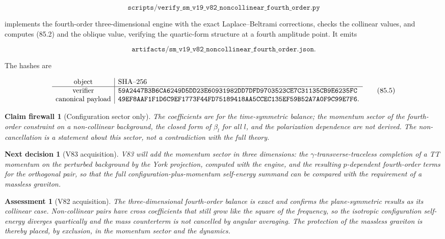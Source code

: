 \documentclass[11pt]{article}
\newtheorem{firewall}[theorem]{Claim firewall}
\newtheorem{decision}[theorem]{Next decision}
\newtheorem{assessment}[theorem]{Assessment}
\theoremstyle{remark}
\begin{document}
\[
 \texttt{scripts/verify\_sm\_v19\_v82\_noncollinear\_fourth\_order.py}
                                                                    \tag{85.3}
\]

implements the fourth-order three-dimensional engine with the exact
Laplace--Beltrami corrections, checks the collinear values, and
computes (85.2) and the oblique value, verifying the quartic-form
structure at a fourth amplitude point.  It emits

\[
 \texttt{artifacts/sm\_v19\_v82\_noncollinear\_fourth\_order.json}.  \tag{85.4}
\]

The hashes are

\[
\begin{array}{c|l}
\hbox{object}&\hbox{SHA--256}\\ \hline
\hbox{verifier}&
\texttt{59A2447B3B6CA6249D5DD23E60931982DD7DFD9703523CE7C31135CB9E6235FC}\\
\hbox{canonical payload}&
\texttt{49EF8AAF1F1D6C9EF1773F44FD75189418AA5CCEC135EF59B52A7A0F9C99E7F6}.
\end{array}                                                     \tag{85.5}
\]

\begin{firewall}[Configuration sector only]
\label{fire:v19v82}
The coefficients are for the time-symmetric balance; the momentum
sector of the fourth-order constraint on a non-collinear background,
the closed form of \(\beta_l\) for all \(l\), and the polarization
dependence are not derived.  The non-cancellation is a statement about
this sector, not a contradiction with the full theory.
\end{firewall}

\begin{decision}[V83 acquisition]
\label{dec:v19v82-next}
V83 will add the momentum sector in three dimensions: the
\(\gamma\)-transverse-traceless completion of a TT momentum on the
perturbed background by the York projection, computed with the engine,
and the resulting \(p\)-dependent fourth-order terms for the
orthogonal pair, so that the full configuration-plus-momentum
self-energy summand can be compared with the requirement of a
massless graviton.
\end{decision}

\begin{assessment}[V82 acquisition]
\label{ass:v19v82}
The three-dimensional fourth-order balance is exact and confirms the
plane-symmetric results as its collinear case.  Non-collinear pairs
have cross coefficients that still grow like the square of the
frequency, so the isotropic configuration self-energy diverges
quartically and the mass counterterm is not cancelled by angular
averaging.  The protection of the massless graviton is thereby placed,
by exclusion, in the momentum sector and the dynamics.
\end{assessment}
\end{document}
